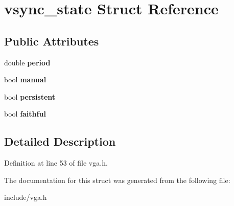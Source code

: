 \hypertarget{structvsync__state}{\section{vsync\-\_\-state Struct Reference}
\label{structvsync__state}
}
\subsection*{Public Attributes}
\begin{DoxyCompactItemize}
\item 
\hypertarget{structvsync__state_ab31e356f8dda57db35c1424304ac5f44}{double {\bfseries period}}\label{structvsync__state_ab31e356f8dda57db35c1424304ac5f44}

\item 
\hypertarget{structvsync__state_a464f94268847e463a0ec9b7657661a86}{bool {\bfseries manual}}\label{structvsync__state_a464f94268847e463a0ec9b7657661a86}

\item 
\hypertarget{structvsync__state_a43ed386d0d457124256caad15f108bac}{bool {\bfseries persistent}}\label{structvsync__state_a43ed386d0d457124256caad15f108bac}

\item 
\hypertarget{structvsync__state_a23b2944857c4a4191aa0c73a7fc1929b}{bool {\bfseries faithful}}\label{structvsync__state_a23b2944857c4a4191aa0c73a7fc1929b}

\end{DoxyCompactItemize}


\subsection{Detailed Description}


Definition at line 53 of file vga.\-h.



The documentation for this struct was generated from the following file\-:\begin{DoxyCompactItemize}
\item 
include/vga.\-h\end{DoxyCompactItemize}
